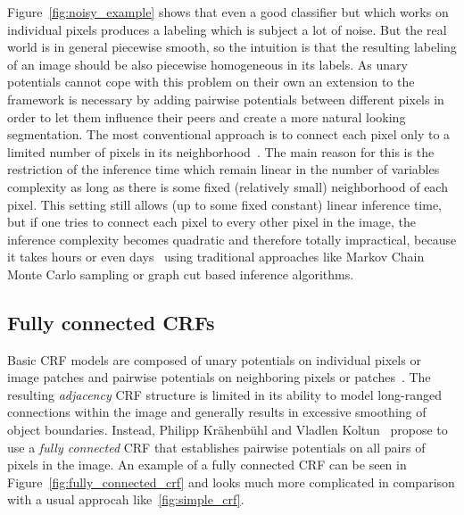 Figure~\ref{fig:noisy_example} shows that even a good classifier but which works on individual pixels produces a labeling which
is subject a lot of noise. But the real world is in general piecewise smooth, so the intuition is that the resulting labeling
of an image should be also piecewise homogeneous in its labels. As unary potentials cannot cope with this problem on their own
an extension to the framework is necessary by adding pairwise potentials between different pixels in order to let them influence
their peers and create a more natural looking segmentation. The most conventional approach is to connect each pixel only to a
limited number of pixels in its neighborhood~\cite{Shotton2009, Verbeek2007}. The main reason for this is the restriction
of the inference time which remain linear in the number of variables complexity as long as there is some fixed (relatively
small) neighborhood of each pixel. This setting still allows (up to some fixed constant) linear inference time, but if one
tries to connect each pixel to every other pixel in the image, the inference complexity becomes quadratic and therefore 
totally impractical, because it takes hours or even days~\cite{Krahenbuhl2011} using traditional approaches like
Markov Chain Monte Carlo sampling or graph cut based inference algorithms.

\subsection{Fully connected CRFs}
\label{fc_crf_method}
Basic CRF models are composed of unary potentials on individual pixels or image patches and pairwise potentials on neighboring
pixels or patches~\cite{Shotton2009, Fulkerson2009, Gould2008, Verbeek2007}. The resulting \emph{adjacency} CRF structure 
is limited in its ability to model long-ranged connections within the image and generally results in excessive 
smoothing of object boundaries. Instead, Philipp Kr\"ahenb\"uhl and Vladlen Koltun~\cite{Krahenbuhl2011} propose
to use a \emph{fully connected} CRF that establishes pairwise potentials on all pairs 
of pixels in the image. An example of a fully connected CRF can be seen in Figure~\ref{fig:fully_connected_crf} and looks
much more complicated in comparison with a usual approcah like~\ref{fig:simple_crf}.

